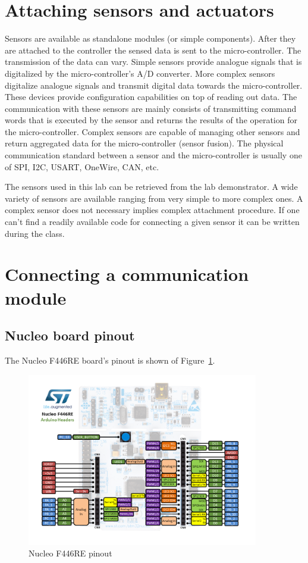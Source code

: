 \documentclass[a4paper]{article}
\begin{document}
\section{Attaching sensors and actuators}

Sensors are available as standalone modules (or simple components). After they are attached to the controller the sensed data is sent to the micro-controller. The transmission of the data can vary. Simple sensors provide analogue signals that is digitalized by the micro-controller's A/D converter. More complex sensors digitalize analogue signals and transmit digital data towards the micro-controller. These devices provide configuration capabilities on top of reading out data. The communication with these sensors are mainly consists of transmitting command words that is executed by the sensor and returns the results of the operation for the micro-controller. Complex sensors are capable of managing other sensors and return aggregated data for the micro-controller (sensor fusion). The physical communication standard between a sensor and the micro-controller is usually one of SPI, I2C, USART, OneWire, CAN, etc.

The sensors used in this lab can be retrieved from the lab demonstrator. A wide variety of sensors are available ranging from very simple to more complex ones. A complex sensor does not necessary implies complex attachment procedure. If one can't find a readily available code for connecting a given sensor it can be written during the class.

\section{Connecting a communication module}

\subsection{Nucleo board pinout}

The Nucleo F446RE board's pinout is shown of Figure~\ref{fig:nucleo-pinout}.

\begin{figure}[H]
    \centering
    \includegraphics[width=0.9\textwidth]{figures/nucleo-pinout.png}
    \caption{Nucleo F446RE pinout}
    \label{fig:nucleo-pinout}
\end{figure}
\end{document}
